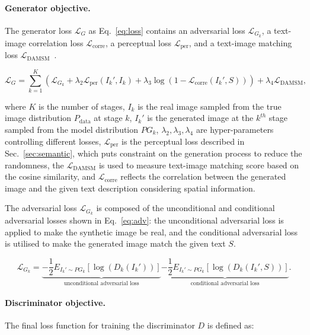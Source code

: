 \paragraph{Generator objective.} The generator loss $\mathcal{L}_G$ as Eq.~\eqref{eq:loss} contains an adversarial loss $\mathcal{L}_{G_k}$, a text-image correlation loss $\mathcal{L}_{\text{corre}}$, a perceptual loss $\mathcal{L}_\text{per}$, and a text-image matching loss $\mathcal{L}_\text{DAMSM}$~\cite{xu2018attngan}.

\begin{equation}
\mathcal{L}_{G}=\sum _{k=1}^{K}(\mathcal{L}_{G_k}+ \lambda_{2}\mathcal{L}_\text{per}({I_{k}}', I_{k}) +  \lambda_3\log(1-\mathcal{L}_\text{corre}(I_k',S))) + \lambda_4\mathcal{L}_\text{DAMSM} 
\textrm{,}
\label{eq:loss}
\end{equation}

where $K$ is the number of stages, $I_{k}$ is the real image sampled from the true image distribution $P_\text{data}$ at stage $k$, ${I_{k}}'$ is the generated image at the $k^{th}$ stage sampled from the model distribution $PG_{k}$, $\lambda_{2}, \lambda_{3}, \lambda_{4}$ are hyper-parameters controlling different losses, $\mathcal{L}_\text{per}$ is the perceptual loss described in Sec.~\ref{sec:semantic}, which puts constraint on the generation process to reduce the randomness, the $\mathcal{L}_\text{DAMSM}$ \cite{xu2018attngan} is used to measure text-image matching score based on the cosine similarity, and $\mathcal{L}_\text{corre}$ reflects the correlation between the generated image and the given text description considering spatial information.

The adversarial loss $\mathcal{L}_{G_k}$ is composed of the unconditional and conditional adversarial losses shown in Eq.~\eqref{eq:adv}: the unconditional adversarial loss is applied to make the synthetic image be real, and the conditional adversarial loss is utilised to make the generated image match the given text $S$.

\begin{equation}
\mathcal{L}_{G_{k}}=\underbrace{-\frac{1}{2}E_{{I_{k}}'\sim PG_{k}}\left [ \log(D_{k}({I_{k}}')) \right ]}_\text{unconditional adversarial loss}\underbrace{-\frac{1}{2}E_{{I_{k}}'\sim PG_{k}}\left [ \log(D_{k}({I_{k}}',S)) \right ]}_\text{conditional adversarial loss}
\textrm{.}
\label{eq:adv}
\end{equation}

\paragraph{Discriminator objective.} The final loss function for training the discriminator $D$ is defined as:

